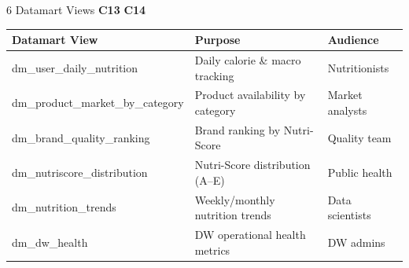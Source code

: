\documentclass[aspectratio=169, 10pt]{beamer}
\newcommand{\competency}[1]{\textbf{\color{ntblue}#1}}
\begin{document}
\begin{frame}{6 Datamart Views \competency{C13} \competency{C14}}
\small
\begin{center}
\begin{tabular}{lll}
  \toprule
  \textbf{Datamart View} & \textbf{Purpose} & \textbf{Audience} \\
  \midrule
  dm\_user\_daily\_nutrition & Daily calorie \& macro tracking & Nutritionists \\
  dm\_product\_market\_by\_category & Product availability by category & Market analysts \\
  dm\_brand\_quality\_ranking & Brand ranking by Nutri-Score & Quality team \\
  dm\_nutriscore\_distribution & Nutri-Score distribution (A--E) & Public health \\
  dm\_nutrition\_trends & Weekly/monthly nutrition trends & Data scientists \\
  dm\_dw\_health & DW operational health metrics & DW admins \\
  \bottomrule
\end{tabular}
\end{center}
\vspace{0.2cm}
\begin{center}
\end{center}
\end{frame}
\end{document}
